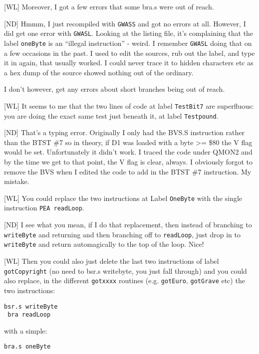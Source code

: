 [WL] Moreover, I got a few errors that some bra.s  were out of reach.

[ND] Hmmm, I just recompiled with \texttt{GWASS} and got no errors at all. However, I did get one error with \texttt{GWASL}. Looking at the listing file, it's complaining that the label \texttt{oneByte} is an ``illegal instruction'' - weird. I remember \texttt{GWASL} doing that on a few occasions in the past. I used to edit the sources, rub out the label, and type it in again, that usually worked. I could never trace it to hidden characters etc as a hex dump of the source showed nothing out of the ordinary.

I don't however, get any errors about short branches being out of reach. 


[WL] It seems to me that the two lines of code at label \texttt{TestBit7} are superfluous: you are doing the exact same test just beneath it, at label \texttt{Testpound}.

[ND] That's a typing error. Originally I only had the BVS.S instruction rather than the BTST \#7 so in theory, if D1 was loaded with a byte >= \$80 the V flag would be set. Unfortunately it didn't work. I traced the code under QMON2 and by the time we get to that point, the V flag is clear, always. I obviously forgot to remove the BVS when I edited the code to add in the BTST \#7 instruction. My mistake.


[WL] You could replace the two instructions at Label \texttt{OneByte} with the single instruction \texttt{PEA readLoop}.

[ND] I see what you mean, if I do that replacement, then instead of branching to \texttt{writeByte} and returning and then branching off to \texttt{readLoop}, just drop in to \texttt{writeByte} and return automagically to the top of the loop. Nice!


[WL] Then you could also just delete the last two instructions of label \texttt{gotCopyright} (no need to bsr.s writebyte, you just fall through) and you could also replace, in the different \texttt{gotxxxx} routines (e.g. \texttt{gotEuro}, \texttt{gotGrave} etc) the two instructions:

\begin{lstlisting}[numbers=none]
 bsr.s writeByte
 bra readLoop
\end{lstlisting}
 
with a simple:

\begin{lstlisting}[numbers=none]
 bra.s oneByte
\end{lstlisting}
 
